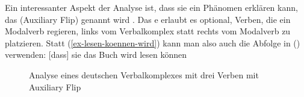 Ein interessanter Aspekt der Analyse ist, dass sie ein Phänomen erklären kann, das \emph{} (Auxiliary
Flip) genannt wird \citep[§60]{Bech55a}. Das e erlaubt es optional, Verben, die ein Modalverb regieren,
links vom Verbalkomplex statt rechts vom Modalverb zu platzieren. Statt
(\ref{ex-lesen-koennen-wird}) kann man also auch die Abfolge in () verwenden:
\ea
{[}dass{]} sie das Buch wird lesen können
\z
\begin{figure}
\caption{\label{fig-wird-lesen-koennen}Analyse eines deutschen Verbalkomplexes mit drei Verben mit
  Auxiliary Flip}
\end{figure}

